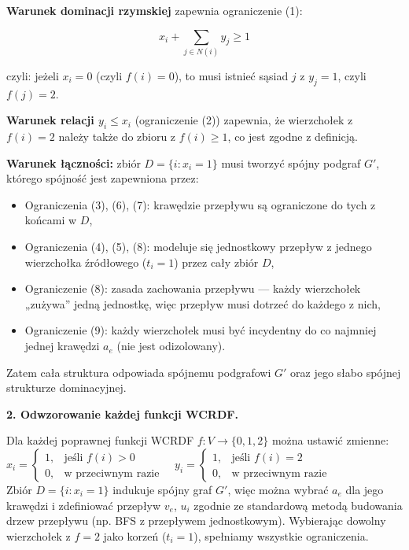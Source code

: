 \textbf{Warunek dominacji rzymskiej} zapewnia ograniczenie (1):

\[
x_i + \sum_{j \in N(i)} y_j \geq 1
\]

czyli: jeżeli \( x_i = 0 \) (czyli \( f(i) = 0 \)), to musi istnieć sąsiad \( j \) z \( y_j = 1 \), czyli \( f(j) = 2 \).

\textbf{Warunek relacji \( y_i \leq x_i \)} (ograniczenie (2)) zapewnia, że wierzchołek z \( f(i) = 2 \) należy także do zbioru z \( f(i) \geq 1 \), co jest zgodne z definicją.

\textbf{Warunek łączności:} zbiór \( D = \{i : x_i = 1\} \) musi tworzyć spójny podgraf \( G' \), którego spójność jest zapewniona przez:

\begin{itemize}
    \item Ograniczenia (3), (6), (7): krawędzie przepływu są ograniczone do tych z końcami w \( D \),
    \item Ograniczenia (4), (5), (8): modeluje się jednostkowy przepływ z jednego wierzchołka źródłowego ($t_i = 1$) przez cały zbiór \( D \),
    \item Ograniczenie (8): zasada zachowania przepływu — każdy wierzchołek „zużywa” jedną jednostkę, więc przepływ musi dotrzeć do każdego z nich,
    \item Ograniczenie (9): każdy wierzchołek musi być incydentny do co najmniej jednej krawędzi $a_e$ (nie jest odizolowany).
\end{itemize}

Zatem cała struktura odpowiada spójnemu podgrafowi \( G' \) oraz jego słabo spójnej strukturze dominacyjnej.

\textbf{2. Odwzorowanie każdej funkcji WCRDF.}

Dla każdej poprawnej funkcji WCRDF \( f : V \to \{0,1,2\} \) można ustawić zmienne:\\
$
x_i =
\begin{cases}
1, & \text{jeśli } f(i) > 0 \\
0, & \text{w przeciwnym razie}
\end{cases}
\quad
y_i =
\begin{cases}
1, & \text{jeśli } f(i) = 2 \\
0, & \text{w przeciwnym razie}
\end{cases}
$\\
Zbiór \( D = \{i : x_i = 1\} \) indukuje spójny graf \( G' \), więc można wybrać \( a_e \) dla jego krawędzi i zdefiniować przepływ \( v_e \), \( u_i \) zgodnie ze standardową metodą budowania drzew przepływu (np. BFS z przepływem jednostkowym). Wybierając dowolny wierzchołek z \( f = 2 \) jako korzeń ($t_i = 1$), spełniamy wszystkie ograniczenia.

